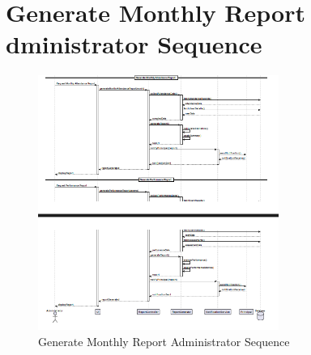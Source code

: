 \documentclass[12pt,a4paper]{report}
\begin{document}
\section{Generate Monthly Report dministrator Sequence}
\begin{figure}[htbp]
    \centering
    \includegraphics[width=0.7\textwidth]{generate-monthly-report-administrator-sequence.png}
    \caption{Generate Monthly Report Administrator Sequence}
    \label{fig:generate-monthly-report-administrator-sequence}
\end{figure}
\end{document}
